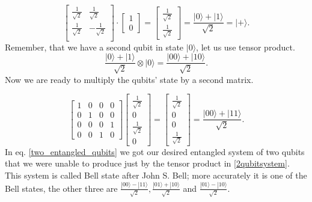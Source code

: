 \begin{equation}
    \begin{bmatrix}
     \frac{1}{\sqrt{2}} & \frac{1}{\sqrt{2}} \\
     \frac{1}{\sqrt{2}} & -\frac{1}{\sqrt{2}}\\
    \end{bmatrix} \cdot
    \begin{bmatrix}
        1 \\
        0 
    \end{bmatrix} =
    \begin{bmatrix}
        \frac{1}{\sqrt{2}} \\
        \frac{1}{\sqrt{2}} 
    \end{bmatrix} = \frac{|0\rangle + |1\rangle}{\sqrt{2}} = |+\rangle.
\end{equation}
Remember, that we have a second qubit in state $|0\rangle$, let us use tensor product.
\begin{equation}
    \frac{|0\rangle + |1\rangle}{\sqrt{2}} \otimes |0\rangle = \frac{|00\rangle + |10\rangle}{\sqrt{2}}.
\end{equation}
Now we are ready to multiply the qubits' state by a second matrix.

\begin{equation} \label{two_entangled_qubits}
    \begin{bmatrix}
        1 & 0 & 0 & 0 \\ 
        0 & 1 & 0 & 0 \\
        0 & 0 & 0 & 1 \\
        0 & 0 & 1 & 0
    \end{bmatrix}
    \begin{bmatrix}
        \frac{1}{{\sqrt{2}}}\\
        0 \\
        \frac{1}{{\sqrt{2}}}\\
        0
    \end{bmatrix} =
    \begin{bmatrix}
        \frac{1}{{\sqrt{2}}}\\
        0 \\
        0\\
        \frac{1}{{\sqrt{2}}}
    \end{bmatrix} = \frac{|00 \rangle + |11 \rangle }{\sqrt{2}}.
\end{equation}
In eq. \ref{two_entangled_qubits} we got our desired entangled system of two qubits that we were unable to produce just by the tensor product in \ref{2qubitsystem}. This system is called Bell state after John S. Bell; more accurately it is one of the Bell states, the other three are $\frac{|00 \rangle - |11 \rangle }{\sqrt{2}}, \frac{|01 \rangle + |10 \rangle }{\sqrt{2}} $ and $ \frac{|01 \rangle - |10 \rangle }{\sqrt{2}}.$

